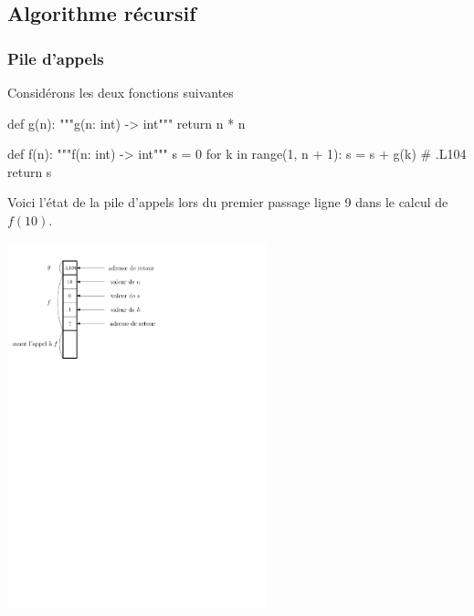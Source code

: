\documentclass{magnolia}
\begin{document}
\subsection{Algorithme récursif}


\subsubsection{Pile d'appels}

Considérons les deux fonctions suivantes

\begin{pythoncodeline}
def g(n):
    """g(n: int) -> int"""
    return n * n

def f(n):
    """f(n: int) -> int"""
    s = 0
    for k in range(1, n + 1):
        s = s + g(k)    # .L104
    return s
\end{pythoncodeline}


\noindent
Voici l'état de la pile d'appels lors du premier passage ligne 9 dans le
calcul de $f(10)$.
    \begin{center}
    \includegraphics[page = 1, width = 7.5cm]{../../Commun/Images/info-cours-complexite_pile}
    \end{center}
\end{document}
